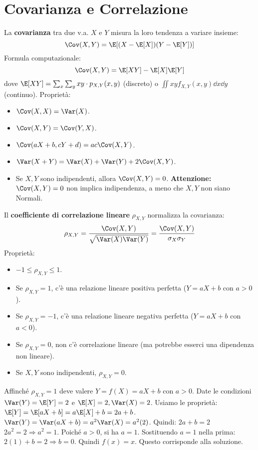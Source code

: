 \section{Covarianza e Correlazione}
\begin{definition}[Covarianza]
La \textbf{covarianza} tra due v.a. $X$ e $Y$ misura la loro tendenza a variare insieme:
\[ \Cov(X,Y) = \E[(X-\E[X])(Y-\E[Y])] \]
Formula computazionale:
\[ \Cov(X,Y) = \E[XY] - \E[X]\E[Y] \]
dove $\E[XY] = \sum_x \sum_y xy \cdot p_{X,Y}(x,y)$ (discreto) o $\iint xy f_{X,Y}(x,y) \dd x \dd y$ (continuo).
Proprietà:
\begin{itemize}
    \item $\Cov(X,X) = \Var(X)$.
    \item $\Cov(X,Y) = \Cov(Y,X)$.
    \item $\Cov(aX+b, cY+d) = ac \Cov(X,Y)$.
    \item $\Var(X+Y) = \Var(X) + \Var(Y) + 2\Cov(X,Y)$.
    \item Se $X, Y$ sono indipendenti, allora $\Cov(X,Y) = 0$. \textbf{Attenzione:} $\Cov(X,Y)=0$ non implica indipendenza, a meno che $X,Y$ non siano Normali.
\end{itemize}
\end{definition}

\begin{definition}
Il \textbf{coefficiente di correlazione lineare} $\rho_{X,Y}$ normalizza la covarianza:
\[ \rho_{X,Y} = \frac{\Cov(X,Y)}{\sqrt{\Var(X)\Var(Y)}} = \frac{\Cov(X,Y)}{\sigma_X \sigma_Y} \]
Proprietà:
\begin{itemize}
    \item $-1 \le \rho_{X,Y} \le 1$.
    \item Se $\rho_{X,Y} = 1$, c'è una relazione lineare positiva perfetta ($Y=aX+b$ con $a>0$).
    \item Se $\rho_{X,Y} = -1$, c'è una relazione lineare negativa perfetta ($Y=aX+b$ con $a<0$).
    \item Se $\rho_{X,Y} = 0$, non c'è correlazione lineare (ma potrebbe esserci una dipendenza non lineare).
    \item Se $X,Y$ sono indipendenti, $\rho_{X,Y}=0$.
\end{itemize}
\end{definition}
\begin{example}
Affinché $\rho_{X,Y}=1$ deve valere $Y = f(X) = aX+b$ con $a>0$.
Date le condizioni $\Var(Y) = \E[Y]=2$ e $\E[X]=2, \Var(X)=2$.
Usiamo le proprietà:
$\E[Y] = \E[aX+b] = a\E[X]+b = 2a+b$.
$\Var(Y) = \Var(aX+b) = a^2\Var(X) = a^2(2)$.
Quindi:
$2a+b = 2$
$2a^2 = 2 \Rightarrow a^2 = 1$. Poiché $a>0$, si ha $a=1$.
Sostituendo $a=1$ nella prima: $2(1)+b=2 \Rightarrow b=0$.
Quindi $f(x) = x$. Questo corrisponde alla soluzione.
\end{example}


